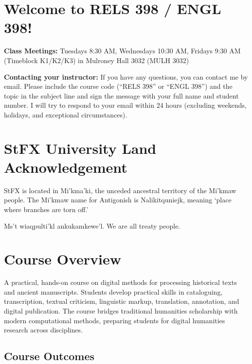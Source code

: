 \documentclass[12pt,oncampus]{article}
\begin{document}

\section*{Welcome to RELS 398 / ENGL 398!}


\textbf{Class Meetings:} Tuesdays 8:30 AM, Wednesdays 10:30 AM, Fridays 9:30 AM (Timeblock K1/K2/K3) in Mulroney Hall 3032 (MULH 3032)

\textbf{Contacting your instructor:} If you have any questions, you can contact me by email. Please include the course code (``RELS 398'' or ``ENGL 398'') and the topic in the subject line and sign the message with your full name and student number. I will try to respond to your email within 24 hours (excluding weekends, holidays, and exceptional circumstances).

\section*{StFX University Land Acknowledgement}

StFX is located in Mi’kma’ki, the unceded ancestral territory of the Mi'kmaw people. The Mi'kmaw name for Antigonish is Nalikitquniejk, meaning ‘place where branches are torn off.’

Ms't wiaqpulti'kl ankukamkewe'l. We are all treaty people.

\section*{Course Overview}

A practical, hands-on course on digital methods for processing historical texts and ancient manuscripts. Students develop practical skills in cataloguing, transcription, textual criticism, linguistic markup, translation, annotation, and digital publication. The course bridges traditional humanities scholarship with modern computational methods, preparing students for digital humanities research across disciplines.

\subsection*{Course Outcomes}
\end{document}
